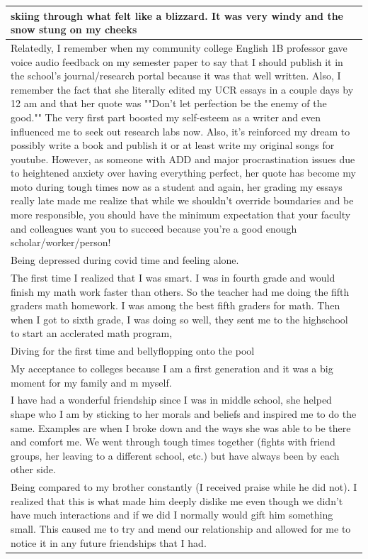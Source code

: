 \documentclass[
  .7em,
  letterpaper,
  DIV=11,
  numbers=noendperiod]{scrartcl}
\begin{document}
\begin{table}
\begin{tabular}{l}
\hline
skiing through what felt like a blizzard. It was very windy and the snow stung on my cheeks\\
\hline
Relatedly, I remember when my community college English 1B professor gave voice audio feedback on my semester paper to say that I should publish it in the school's journal/research portal because it was that well written. Also, I remember the fact that she literally edited my UCR essays in a couple days by 12 am and that her quote was ""Don't let perfection be the enemy of the good."" The very first part boosted my self-esteem as a writer and even influenced me to seek out research labs now. Also, it's reinforced my dream to possibly write a book and publish it or at least write my original songs for youtube. However, as someone with ADD and major procrastination issues due to heightened anxiety over having everything perfect, her quote has become my moto during tough times now as a student and again, her grading my essays really late made me realize that while we shouldn't override boundaries and be more responsible, you should have the minimum expectation that your faculty and colleagues want you to succeed because you're a good enough scholar/worker/person!\\
\hline
Being depressed during covid time and feeling alone.\\
\hline
The first time I realized that I was smart. I was in fourth grade and would finish my math work faster than others. So the teacher had me doing the fifth graders math homework. I was among the best fifth graders for math. Then when I got to sixth grade, I was doing so well, they sent me to the highschool to start an acclerated math program,\\
\hline
Diving for the first time and bellyflopping onto the pool\\
\hline
My acceptance to colleges because I am a first generation and it was a big moment for my family and m myself.\\
\hline
I have had a wonderful friendship since I was in middle school, she helped shape who I am by sticking to her morals and beliefs and inspired me to do the same. Examples are when I broke down and the ways she was able to be there and comfort me. We went through tough times together (fights with friend groups, her leaving to a different school, etc.) but have always been by each other side.\\
\hline
Being compared to my brother constantly (I received praise while he did not). I realized that this is what made him deeply dislike me even though we didn't have much interactions and if we did I normally would gift him something small. This caused me to try and mend our relationship and allowed for me to notice it in any future friendships that I had.\\

\end{tabular}
\end{table}
\end{document}
